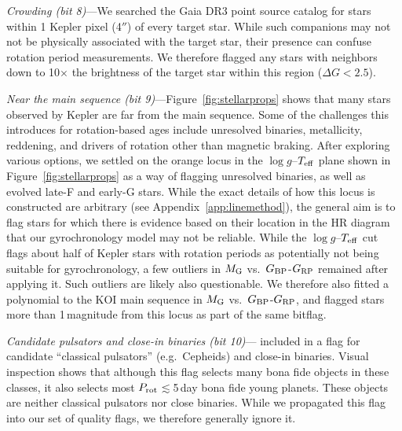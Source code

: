 \documentclass[11pt,twocolumn,tighten,linenumbers]{aastex63}
\begin{document}
{\it Crowding (bit 8)}---We searched the Gaia DR3 point source catalog
for stars within 1 Kepler pixel (4$''$) of every target star.  While
such companions may not not be physically associated with the target
star, their presence can confuse rotation period measurements.  We
therefore flagged any stars with neighbors down to 10$\times$ the
brightness of the target star within this region ($\Delta G < 2.5$).

{\it Near the main sequence (bit 9)}---Figure~\ref{fig:stellarprops} shows
that many stars observed by Kepler
are far from the main sequence.  Some of the challenges this introduces
for rotation-based ages include unresolved binaries, metallicity,
reddening, and drivers of rotation other than magnetic braking.
After exploring various options, we settled on the orange locus in the
$\log g$--$T_{\rm eff}$ plane shown in Figure~\ref{fig:stellarprops}
as a way of flagging unresolved binaries, as well as evolved
late-F and early-G stars.  While the exact details of how this locus
is constructed are arbitrary (see Appendix~\ref{app:linemethod}), the
general aim is to flag stars for which there is evidence based on
their location in the HR diagram that our gyrochronology model may not
be reliable.  While the $\log g$--$T_{\rm eff}$ cut flags about half
of Kepler stars with rotation periods as potentially not being
suitable for gyrochronology, a few outliers in $M_{\rm G}$ vs.~$G_{\rm
BP}$-$G_{\rm RP}$ remained after applying it.  Such outliers are
likely also questionable.  We therefore also fitted a polynomial to
the KOI main sequence in $M_{\rm G}$ vs.~$G_{\rm
	BP}$-$G_{\rm RP}$, and flagged stars more than 1\,magnitude from
this locus as part of the same bitflag.



{\it Candidate pulsators and close-in binaries (bit
10)}---\citeauthor{Santos_2021} included in a flag for candidate
``classical pulsators'' (e.g.\ Cepheids) and close-in binaries.
Visual inspection shows that although this flag selects many bona fide
objects in these classes, it also selects most $P_{\rm
rot}$$\lesssim$5\,day bona fide young planets.  These objects are
neither classical pulsators nor close binaries.  While we propagated
this flag into our set of quality flags, we therefore generally ignore
it.
\end{document}
